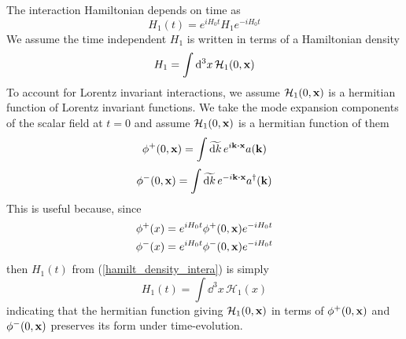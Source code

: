 The interaction Hamiltonian depends on time as 
\begin{equation}
    H_1(t)=e^{iH_0t}H_1e^{-iH_0t}
\end{equation}
We assume the time independent $H_1$ is written in terms of a Hamiltonian density
\begin{equation}
    H_1=\int\dd^3x\,\mathcal{H}_1(0,\vb{x})
    \label{hamilt_density_intera}
\end{equation}
To account for Lorentz invariant interactions, we assume $\mathcal{H}_1(0,\vb{x})$ is a hermitian function of Lorentz invariant functions. We take the mode expansion components of the scalar field at $t=0$ and assume $\mathcal{H}_1(0,\vb{x})$ is a hermitian function of them
\begin{equation}
    \phi^+(0,\vb{x})=\int\widetilde{\dd k}\,e^{i\vb{k}\vdot\vb{x}}a(\vb{k})
    \end{equation}
\begin{equation}
    \phi^-(0,\vb{x})=\int\widetilde{\dd k}\,e^{-i\vb{k}\vdot\vb{x}}a^\dagger(\vb{k})
    \end{equation}
This is useful because, since
\begin{equation}
\begin{aligned}
      \phi^+(x)&=e^{iH_0t}\phi^+(0,\vb{x})e^{-iH_0t}\\
      \phi^-(x)&=e^{iH_0t}\phi^-(0,\vb{x})e^{-iH_0t}
\end{aligned}
\end{equation}
then $H_1(t)$ from (\ref{hamilt_density_intera}) is simply
\begin{equation}
    H_1(t)=\int\dd^3 x\,\mathcal{H}_1(x)
\end{equation}
indicating that the hermitian function giving $\mathcal{H}_1(0,\vb{x})$ in terms of $\phi^+(0,\vb{x})$ and $\phi^-(0,\vb{x})$ preserves its form under time-evolution.\\

